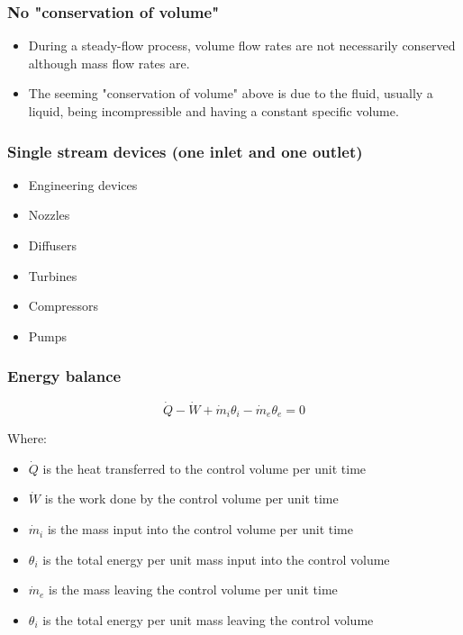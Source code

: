 \documentclass[11pt]{article}
\begin{document}
\subsubsection{No "conservation of volume"}
\label{sec:orgd64d0dd}
\begin{itemize}
\item During a steady-flow process, volume flow rates are not necessarily conserved although mass flow rates are.
\item The seeming "conservation of volume" above is due to the fluid, usually a liquid, being incompressible and having a constant specific volume.
\end{itemize}

\subsubsection{Single stream devices (one inlet and one outlet)}
\label{sec:org844e375}
\begin{itemize}
\item Engineering devices
\item Nozzles
\item Diffusers
\item Turbines
\item Compressors
\item Pumps
\end{itemize}

\newpage

\subsubsection{Energy balance}
\label{sec:org20fbc37}
\[\dot{Q} - \dot{W} + \dot{m}_i \theta_i - \dot{m}_e \theta_e = 0 \tag{1}\]

Where:
\begin{itemize}
\item \(\dot{Q}\) is the heat transferred to the control volume per unit time
\item \(\dot{W}\) is the work done by the control volume per unit time
\item \(\dot{m}_i\) is the mass input into the control volume per unit time
\item \(\theta_i\) is the total energy per unit mass input into the control volume
\item \(\dot{m}_e\) is the mass leaving the control volume per unit time
\item \(\theta_i\) is the total energy per unit mass leaving the control volume
\end{itemize}
\end{document}
